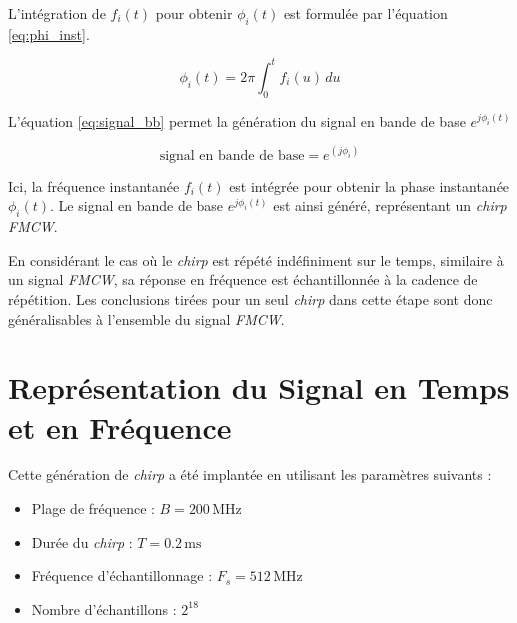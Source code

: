 L'intégration de \( f_i(t) \) pour obtenir \( \phi_i(t) \) est formulée par l'équation \ref{eq:phi_inst}.

\begin{equation}
    \phi_i(t) = 2\pi \int_{0}^{t} f_i(u) \, du
    \label{eq:phi_inst}
\end{equation}


L'équation \ref{eq:signal_bb} permet la génération du signal en bande de base \( e^{j\phi_i(t)} \) 

\begin{equation}
    \text{signal en bande de base} = e^{(j \phi_i)}
    \label{eq:signal_bb}
\end{equation}

Ici, la fréquence instantanée \( f_i(t) \) est intégrée pour obtenir la phase instantanée \( \phi_i(t) \). Le signal en bande de base \( e^{j\phi_i(t)} \) est ainsi généré, représentant un \textit{chirp FMCW}.

En considérant le cas où le \textit{chirp} est répété indéfiniment sur le temps, similaire à un signal \textit{FMCW}, sa réponse en fréquence est échantillonnée à la cadence de répétition. Les conclusions tirées pour un seul \textit{chirp} dans cette étape sont donc généralisables à l'ensemble du signal \textit{FMCW}.

\section {Représentation du Signal en Temps et en Fréquence}

Cette génération de \textit{chirp} a été implantée en utilisant les paramètres suivants :
\begin{itemize}
  \item Plage de fréquence : \( B = 200 \, \text{MHz} \)
  \item Durée du \textit{chirp} : \( T = 0.2 \, \text{ms} \)
  \item Fréquence d'échantillonnage : \( F_s = 512 \, \text{MHz} \)
  \item Nombre d'échantillons : \( 2^{18} \)
\end{itemize}

